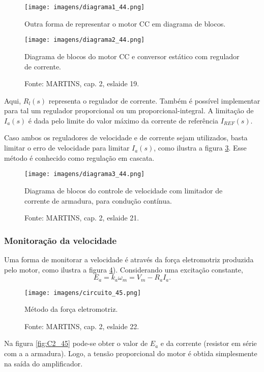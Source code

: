 \begin{figure}[ht!]
\center
\texttt{[image: imagens/diagrama1\_44.png]}
\caption{\label{fig:D1_44}Outra forma de representar o motor CC em diagrama de blocos.}
\end{figure} 

\begin{figure}[ht!]
\center
\texttt{[image: imagens/diagrama2\_44.png]}
\caption{\label{fig:D2_44}Diagrama de blocos do  motor CC e conversor estático com regulador de corrente.}
\caption*{Fonte: MARTINS, cap. 2, eslaide 19.}
\end{figure} 

Aqui, $R_{l}(s)$ representa o regulador de corrente. Também é possível implementar para tal um regulador proporcional ou um proporcional-integral. A limitação de $I_{a}(s)$ é dada pelo limite do valor máximo da corrente de referência $I_{REF}(s)$.

Caso ambos os reguladores de velocidade e de corrente sejam utilizados, basta limitar o erro de velocidade para limitar $I_{a}(s)$, como ilustra a figura \ref{fig:D3_44}. Esse método é conhecido como regulação em cascata.

\begin{figure}[ht!]
\center
\texttt{[image: imagens/diagrama3\_44.png]}
\caption{\label{fig:D3_44}Diagrama de blocos do controle de velocidade com limitador de corrente de armadura, para condução contínua.}
\caption*{Fonte: MARTINS, cap. 2, eslaide 21.}
\end{figure} 

\subsubsection{Monitoração da velocidade}

Uma forma de monitorar a velocidade é através da força eletromotriz produzida pelo motor, como ilustra a figura \ref{fig:C1_45}). Considerando uma excitação constante,
\[E_{a} = k_{a}\omega_{m} = V_{m} - R_{a}I_{a}.\]

\begin{figure}[ht!]
\center
\texttt{[image: imagens/circuito\_45.png]}
\caption{\label{fig:C1_45} Método da força eletromotriz.}
\caption*{Fonte: MARTINS, cap. 2, eslaide 22.}
\end{figure} 

Na figura \ref{fig:C2_45} pode-se obter o valor de $E_{a}$ e da corrente (resistor em série com a a armadura). Logo, a tensão proporcional do motor é obtida simplesmente na saída do amplificador.

